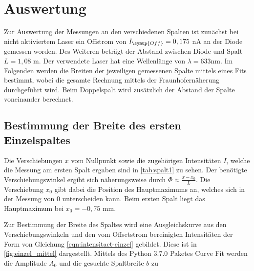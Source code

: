 \section{Auswertung}
\label{sec:Auswertung}
Zur Auswertung der Messungen an den verschiedenen Spalten ist zunächst bei nicht aktiviertem Laser ein Offstrom von
$I_{\symup{Off}} = 0,175$ nA an der Diode gemessen worden.
Des Weiteren beträgt der Abstand zwischen Diode und Spalt $L = 1,08$ m. Der verwendete Laser hat eine Wellenlänge von $\lambda = 633$nm.
Im Folgenden werden die Breiten der jeweiligen gemessenen Spalte mittels eines Fits bestimmt, wobei die gesamte Rechnung mittels 
der Fraunhofernäherung durchgeführt wird. Beim Doppelspalt wird zusätzlich
der Abstand der Spalte voneinander berechnet.
\subsection{Bestimmung der Breite des ersten Einzelspaltes}
    Die Verschiebungen $x$ vom Nullpunkt sowie die zugehörigen Intensitäten $I$, welche die Messung am ersten Spalt ergaben sind in \autoref{tab:spalt1}
    zu sehen. Der benötigte Verschiebungswinkel ergibt sich näherungsweise durch $\Phi \approx \frac{x -x_0}{L}$. Die Verschiebung $x_0$ gibt dabei die 
    Position des Hauptmaximums an, welches sich in der Messung von $0$ unterscheiden kann. Beim ersten Spalt liegt das Hauptmaximum bei 
    $x_0 = - 0,75$ mm.
    
    Zur Bestimmung der Breite des Spaltes wird eine Ausgleichskurve aus den Verschiebungswinkeln und den vom Offsetstrom bereinigten
    Intensitäten der Form von Gleichung \eqref{eqn:intensitaet-einzel} gebildet. 
    Diese ist in \autoref{fig:einzel_mittel} dargestellt. Mittels des Python 3.7.0 Paketes Curve Fit werden die Amplitude $A_0$ und die gesuchte Spaltbreite $b$ zu 
    
